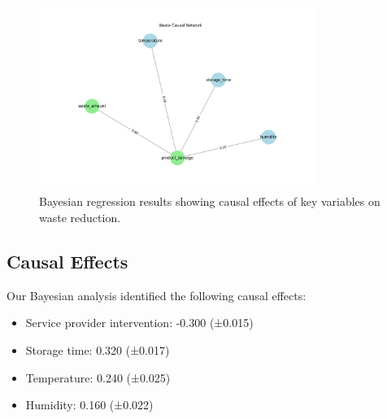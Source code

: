 \documentclass[12pt]{article}
\theoremstyle{definition}
\begin{document}
\begin{figure}[h]
\centering
\includegraphics[width=0.8\textwidth]{../data/causal_network.png}
\caption{Bayesian regression results showing causal effects of key variables on waste reduction.}
\label{fig:causal_analysis}
\end{figure}

\subsection{Causal Effects}
Our Bayesian analysis identified the following causal effects:
\begin{itemize}
    \item Service provider intervention: -0.300 (±0.015)
    \item Storage time: 0.320 (±0.017)
    \item Temperature: 0.240 (±0.025)
    \item Humidity: 0.160 (±0.022)
\end{itemize}
\end{document}
